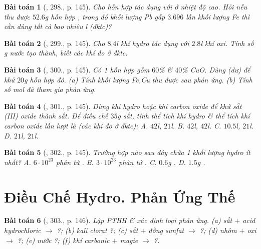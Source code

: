 \documentclass{article}
\newtheorem{baitoan}{Bài toán}
\begin{document}
\begin{baitoan}[\cite{An_400_BT_Hoa_Hoc_8_2020}, 298., p. 145]
	Cho hỗn hợp \emph{} tác dụng với \emph{} ở nhiệt độ cao. Hỏi nếu thu được $52.6$\emph{g} hỗn hợp \emph{}, trong đó khối lượng \emph{Pb} gấp $3.696$ lần khối lượng \emph{Fe} thì cần dùng tất cả bao nhiêu \emph{l} \emph{} (đktc)?
\end{baitoan}

\begin{baitoan}[\cite{An_400_BT_Hoa_Hoc_8_2020}, 299., p. 145]
	Cho $8.4$\emph{l} khí hydro tác dụng với $2.8$\emph{l} khí oxi. Tính số \emph{g} nước tạo thành, biết các khí đo ở đktc.
\end{baitoan}

\begin{baitoan}[\cite{An_400_BT_Hoa_Hoc_8_2020}, 300., p. 145]
	Có 1 hỗn hợp gồm $60$\% \emph{} \& $40$\% \emph{CuO}. Dùng \emph{} (dư) để khử $20$\emph{g} hỗn hợp đó. (a) Tính khối lượng \emph{Fe,Cu} thu được sau phản ứng. (b) Tính số mol \emph{} đã tham gia phản ứng.
\end{baitoan}

\begin{baitoan}[\cite{An_400_BT_Hoa_Hoc_8_2020}, 301., p. 145]
	Dùng khí hydro hoặc khí carbon oxide để khử sắt (III) oxide thành sắt. Để điều chế $35$\emph{g} sắt, tính thể tích khí hydro \& thể tích khí carbon oxide lần lượt là (các khí đo ở đktc): {\sf A.} $42$\emph{l}, $21$\emph{l}. {\sf B.} $42$\emph{l}, $42$\emph{l}. {\sf C.} $10.5$\emph{l}, $21$\emph{l}. {\sf D.} $21$\emph{l}, $21$\emph{l}.
\end{baitoan}

\begin{baitoan}[\cite{An_400_BT_Hoa_Hoc_8_2020}, 302., p. 145]
	Trường hợp nào sau đây chứa 1 khối lượng hydro ít nhất? {\sf A.} $6\cdot10^{23}$ phân tử \emph{}. {\sf B.} $3\cdot10^{23}$ phân tử \emph{}. {\sf C.} $0.6$\emph{g} \emph{}. {\sf D.} $1.5$\emph{g} \emph{}.
\end{baitoan}


\section{Điều Chế Hydro. Phản Ứng Thế}

\begin{baitoan}[\cite{An_400_BT_Hoa_Hoc_8_2020}, 303., p. 146]
	Lập PTHH \& xác định loại phản ứng. (a) sắt $+$ acid hydrochloric $\to$ ?; (b) kali clorat \ce{->[$t^\circ$]} ?; (c) sắt $+$ đồng sunfat $\to$ ?; (d) nhôm $+$ oxi $\to$ ?; (e) nước  ?; (f) khí carbonic $+$ magie $\to$ ?.
\end{baitoan}
\end{document}

